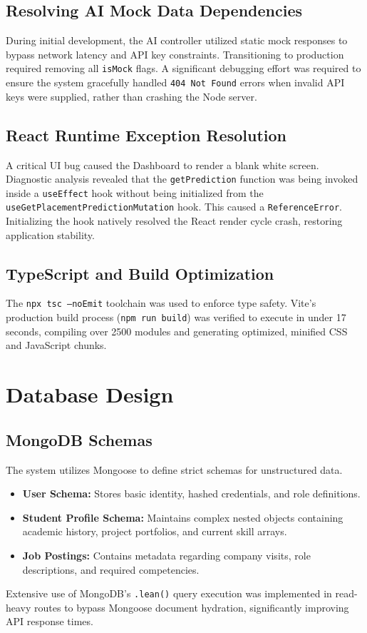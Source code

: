 \documentclass[12pt,a4paper]{report}
\begin{document}
\section{Resolving AI Mock Data Dependencies}
During initial development, the AI controller utilized static mock responses to bypass network latency and API key constraints. Transitioning to production required removing all \texttt{isMock} flags. A significant debugging effort was required to ensure the system gracefully handled \texttt{404 Not Found} errors when invalid API keys were supplied, rather than crashing the Node server.

\section{React Runtime Exception Resolution}
A critical UI bug caused the Dashboard to render a blank white screen. Diagnostic analysis revealed that the \texttt{getPrediction} function was being invoked inside a \texttt{useEffect} hook without being initialized from the \texttt{useGetPlacementPredictionMutation} hook. This caused a \texttt{ReferenceError}. Initializing the hook natively resolved the React render cycle crash, restoring application stability.

\section{TypeScript and Build Optimization}
The \texttt{npx tsc --noEmit} toolchain was used to enforce type safety. Vite's production build process (\texttt{npm run build}) was verified to execute in under 17 seconds, compiling over 2500 modules and generating optimized, minified CSS and JavaScript chunks.

\chapter{Database Design}
\section{MongoDB Schemas}
The system utilizes Mongoose to define strict schemas for unstructured data.
\begin{itemize}
    \item \textbf{User Schema:} Stores basic identity, hashed credentials, and role definitions.
    \item \textbf{Student Profile Schema:} Maintains complex nested objects containing academic history, project portfolios, and current skill arrays.
    \item \textbf{Job Postings:} Contains metadata regarding company visits, role descriptions, and required competencies.
\end{itemize}
Extensive use of MongoDB's \texttt{.lean()} query execution was implemented in read-heavy routes to bypass Mongoose document hydration, significantly improving API response times.
\end{document}
